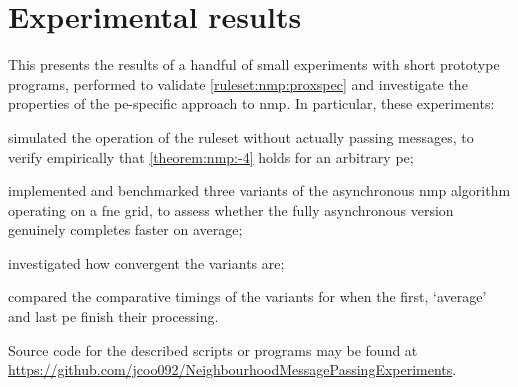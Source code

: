 \section{\label{sec:nmp:experiments}Experimental results}


This  presents the results of a handful of small experiments with short prototype programs, performed to validate \cref{ruleset:nmp:proxspec} and investigate the properties of the \gls{pe}-specific approach to \gls{nmp}.  In particular, these experiments:
\begin{inparaenum}[(i)]
\item simulated the operation of the ruleset without actually passing messages, to verify empirically that \cref{theorem:nmp:-4} holds for an arbitrary \gls{pe};
\item implemented and benchmarked three variants of the asynchronous \gls{nmp} algorithm operating on a \gls{fne} grid, to assess whether the fully asynchronous version genuinely completes faster on average;
\item investigated how convergent the variants are;
\item compared the comparative timings of the variants for when the first, `average' and last \gls{pe} finish their processing.
\end{inparaenum}
Source code for the described scripts or programs may be found at \url{https://github.com/jcoo092/NeighbourhoodMessagePassingExperiments}.

